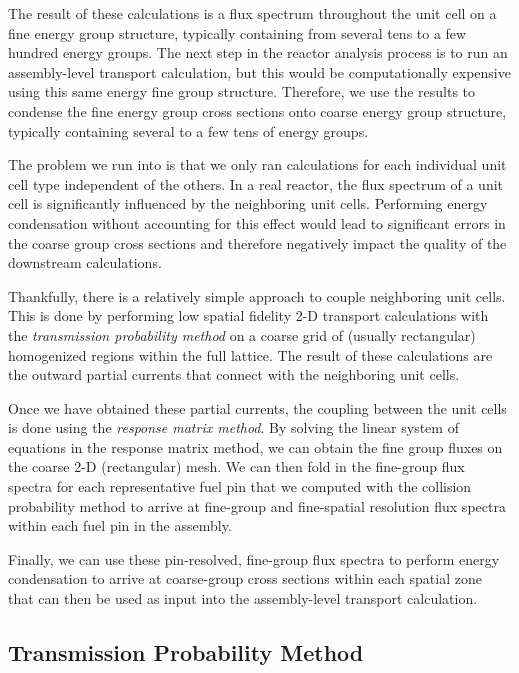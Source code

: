 The result of these calculations is a flux spectrum throughout the unit cell on a fine energy group structure, typically containing from several tens to a few hundred energy groups. The next step in the reactor analysis process is to run an assembly-level transport calculation, but this would be computationally expensive using this same energy fine group structure. Therefore, we use the results to condense the fine energy group cross sections onto coarse energy group structure, typically containing several to a few tens of energy groups.

The problem we run into is that we only ran calculations for each individual unit cell type independent of the others. In a real reactor, the flux spectrum of a unit cell is significantly influenced by the neighboring unit cells. Performing energy condensation without accounting for this effect would lead to significant errors in the coarse group cross sections and therefore negatively impact the quality of the downstream calculations.

Thankfully, there is a relatively simple approach to couple neighboring unit cells. This is done by performing low spatial fidelity 2-D transport calculations with the \emph{transmission probability method} on a coarse grid of (usually rectangular) homogenized regions within the full lattice. The result of these calculations are the outward partial currents that connect with the neighboring unit cells.

Once we have obtained these partial currents, the coupling between the unit cells is done using the \emph{response matrix method}. By solving the linear system of equations in the response matrix method, we can obtain the fine group fluxes on the coarse 2-D (rectangular) mesh. We can then fold in the fine-group flux spectra for each representative fuel pin that we computed with the collision probability method to arrive at fine-group and fine-spatial resolution flux spectra within each fuel pin in the assembly.

Finally, we can use these pin-resolved, fine-group flux spectra to perform energy condensation to arrive at coarse-group cross sections within each spatial zone that can then be used as input into the assembly-level transport calculation.




\subsection{Transmission Probability Method}

